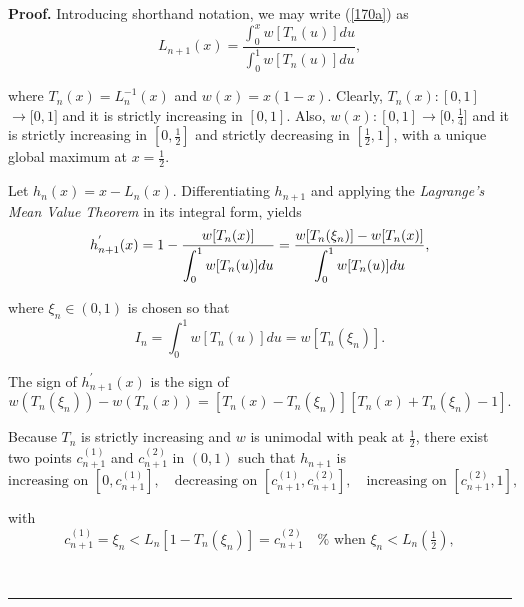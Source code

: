 \documentclass[onecolumn]{article}
\providecommand{\dint}{\displaystyle\int}
\newenvironment{proof}[1][Proof]{\noindent\textbf{#1.} }{\ \rule{0.5em}{0.5em}}
\renewcommand{\dint}{\displaystyle\int}
\begin{document}
\begin{proof}
Introducing shorthand notation, we may write (\ref{170a}) as%
\begin{equation}
L_{n+1}(x)=\frac{\dint\nolimits_{0}^{x}w[T_{n}(u)]du}{\dint%
\nolimits_{0}^{1}w[T_{n}(u)]du},  \label{170}
\end{equation}

where $T_{n}(x)=L_{n}^{-1}(x)$ and $w(x)=x(1-x)$. Clearly, $T_{n}(x):[0,1]$ $%
\rightarrow \lbrack 0,1]$ and it is strictly increasing in $[0,1].$ Also, $%
w(x):[0,1]\rightarrow \lbrack 0,\frac{1}{4}]$ and it is strictly increasing
in $[0,\frac{1}{2}]$ and strictly decreasing in $[\frac{1}{2},1]$, with a
unique global maximum at $x=\tfrac{1}{2}$.

Let $h_{n}(x)=x-L_{n}(x)$. Differentiating $h_{n+1}$ and applying the 
\textit{Lagrange's Mean Value Theorem} in its integral form, yields%
\begin{equation}
h_{n+1}^{^{\prime }}(x)=1-\frac{w[T_{n}(x)]}{\dint%
\nolimits_{0}^{1}w[T_{n}(u)]du}=\frac{w[T_{n}(\xi _{n})]-w[T_{n}(x)]}{%
\dint\nolimits_{0}^{1}w[T_{n}(u)]du},  \label{171}
\end{equation}

where $\xi _{n}\in (0,1)$ is chosen so that%
\begin{equation}
I_{n}=\dint\nolimits_{0}^{1}w[T_{n}(u)]du=w[T_{n}(\xi _{n})].  \label{171b}
\end{equation}

The sign of $h_{n+1}^{\prime }(x)$ is the sign of%
\begin{equation}
w(T_{n}(\xi _{n}))-w(T_{n}(x))=\left[ T_{n}(x)-T_{n}(\xi _{n})\right] \left[
T_{n}(x)+T_{n}(\xi _{n})-1\right] .  \label{171a}
\end{equation}

Because $T_{n}$ is strictly increasing and $w$ is unimodal with peak at $%
\tfrac{1}{2}$, there exist two points $c_{n+1}^{(1)}$ and $c_{n+1}^{(2)}$ in 
$(0,1)$ such that $h_{n+1}$ is 
\begin{equation}
\text{increasing on }[0,c_{n+1}^{(1)}],\quad \text{decreasing on }%
[c_{n+1}^{(1)},c_{n+1}^{(2)}],\quad \text{increasing on }[c_{n+1}^{(2)},1],
\label{171c}
\end{equation}

with%
\begin{equation}
c_{n+1}^{(1)}=\xi _{n}<L_{n}[1-T_{n}(\xi _{n})]=c_{n+1}^{(2)}\quad \text{%
when }\xi _{n}<L_{n}\!(\tfrac{1}{2}),  \label{171d}
\end{equation}


\end{proof}
\end{document}
